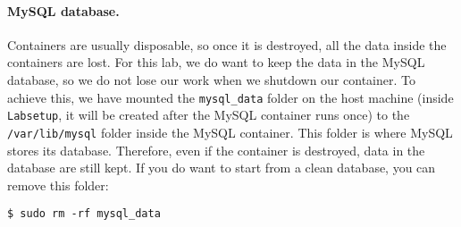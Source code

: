 
\paragraph{MySQL database.}
Containers are usually disposable, so once it
is destroyed, all the data inside the containers are lost.
For this lab, we do want to keep the data in the
MySQL database, so we do not lose our work when we shutdown
our container. To achieve this,
we have mounted the \texttt{mysql\_data} folder on
the host machine (inside
\texttt{Labsetup}, it will be created after the
MySQL container runs once) to the
\texttt{/var/lib/mysql} folder
inside the MySQL container.
This folder is where
MySQL stores its database. Therefore,
even if the container is destroyed,
data in the database are still kept.
If you do want to start from a clean
database, you can remove this folder:

\begin{lstlisting}
$ sudo rm -rf mysql_data
\end{lstlisting}

